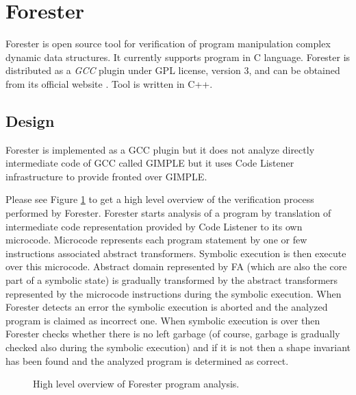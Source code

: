

\section{Forester}
\label{sec:FA}

Forester is open source tool for verification of program manipulation complex dynamic data structures.
It currently supports program in C language.
Forester is distributed as a \emph{GCC} plugin under GPL license, version 3, and can be obtained from its official website \cite{www:forester}.
Tool is written in C++.

\subsection{Design}

Forester is implemented as a GCC plugin but it does not analyze directly intermediate code of GCC called GIMPLE but it
uses Code Listener infrastructure \cite{cl11} to provide fronted over GIMPLE.

Please see Figure \ref{fig:fa_exec} to get a high level overview of the verification process performed by Forester. 
Forester starts analysis of a program by translation of intermediate code representation provided by Code Listener
to its own microcode.
Microcode represents each program statement by one or few instructions associated abstract transformers.
Symbolic execution is then execute over this microcode.
Abstract domain represented by FA (which are also the core part of a symbolic state) is gradually transformed by the abstract transformers
represented by the microcode instructions during the symbolic execution.
When Forester detects an error the symbolic execution is aborted and the analyzed program is claimed as incorrect one.
When symbolic execution is over then Forester checks whether there is no left garbage (of course, garbage is gradually checked also during the symbolic execution)
and if it is not then a shape invariant has been found and the analyzed program is determined as correct.

\begin{figure}[bt]
	\begin{center}
		
	\end{center}
	\caption{High level overview of Forester program analysis.}
	\label{fig:fa_exec}
\end{figure}

